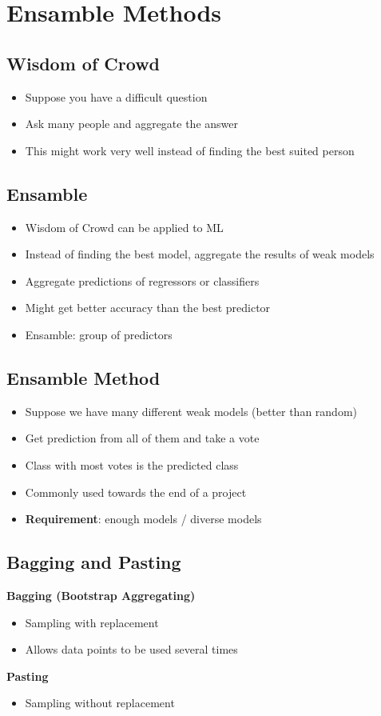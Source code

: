 \section{Ensamble Methods}
\subsection{Wisdom of Crowd}
\begin{itemize}
    \item Suppose you have a difficult question
    \item Ask many people and aggregate the answer
    \item This might work very well instead of finding the best suited person
\end{itemize}

\subsection{Ensamble}
\begin{itemize}
    \item Wisdom of Crowd can be applied to ML
    \item Instead of finding the best model, aggregate the results of weak models
    \item Aggregate predictions of regressors or classifiers
    \item Might get better accuracy than the best predictor
    \item Ensamble: group of predictors
\end{itemize}

\subsection{Ensamble Method}
\begin{itemize}
    \item Suppose we have many different weak models (better than random)
    \item Get prediction from all of them and take a vote
    \item Class with most votes is the predicted class
    \item Commonly used towards the end of a project
    \item \textbf{Requirement}: enough models / diverse models
\end{itemize}

\subsection{Bagging and Pasting}
\textbf{Bagging (Bootstrap Aggregating)}
\begin{itemize}
    \item Sampling with replacement
    \item Allows data points to be used several times
\end{itemize}
\textbf{Pasting}
\begin{itemize}
    \item Sampling without replacement
\end{itemize}

